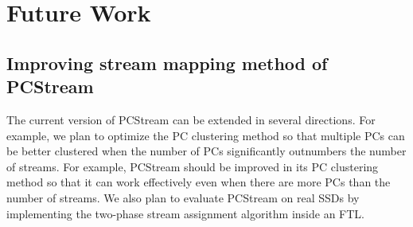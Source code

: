 \section{Future Work}
\subsection{Improving stream mapping method of PCStream}

The current version of \textsf{\small PCStream} can be extended in several directions.  
For example, we plan to optimize the PC clustering method so that
multiple PCs can be better clustered when the number of PCs significantly
outnumbers the number of streams.  
For example, \textsf{\small PCStream} should be improved in its PC clustering method 
so that it can work effectively even when there are more PCs than the number of streams.  
We also plan to evaluate \textsf{\small PCStream} on real SSDs 
by implementing the two-phase stream assignment algorithm inside an FTL.
